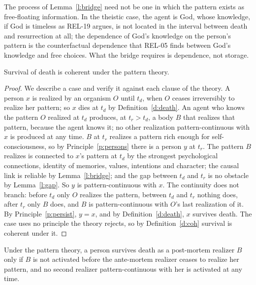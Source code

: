 \documentclass{situationist-preprint}
\begin{document}
The process of Lemma~\ref{l:bridge} need not be one in which the pattern exists as free-floating information. In the theistic case, the agent is God, whose knowledge, if God is timeless as REL-19 argues, is not located in the interval between death and resurrection at all; the dependence of God's knowledge on the person's pattern is the counterfactual dependence that REL-05 finds between God's knowledge and free choices. What the bridge requires is dependence, not storage.

\begin{theorem}[Coherence]\label{t:coh}
Survival of death is coherent under the pattern theory.
\end{theorem}

\begin{proof}
We describe a case and verify it against each clause of the theory. A person $x$ is realized by an organism $O$ until $t_d$, when $O$ ceases irreversibly to realize her pattern; so $x$ dies at $t_d$ by Definition~\ref{d:death}. An agent who knows the pattern $O$ realized at $t_d$ produces, at $t_r > t_d$, a body $B$ that realizes that pattern, because the agent knows it; no other realization pattern-continuous with $x$ is produced at any time. $B$ at $t_r$ realizes a pattern rich enough for self-consciousness, so by Principle~\ref{p:persons} there is a person $y$ at $t_r$. The pattern $B$ realizes is connected to $x$'s pattern at $t_d$ by the strongest psychological connections, identity of memories, values, intentions and character; the causal link is reliable by Lemma~\ref{l:bridge}; and the gap between $t_d$ and $t_r$ is no obstacle by Lemma~\ref{l:gap}. So $y$ is pattern-continuous with $x$. The continuity does not branch: before $t_d$ only $O$ realizes the pattern, between $t_d$ and $t_r$ nothing does, after $t_r$ only $B$ does, and $B$ is pattern-continuous with $O$'s last realization of it. By Principle~\ref{p:persist}, $y = x$, and by Definition~\ref{d:death}, $x$ survives death. The case uses no principle the theory rejects, so by Definition~\ref{d:coh} survival is coherent under it.
\end{proof}

\begin{proposition}[Timing]\label{p:timing}
Under the pattern theory, a person survives death as a post-mortem realizer $B$ only if $B$ is not activated before the ante-mortem realizer ceases to realize her pattern, and no second realizer pattern-continuous with her is activated at any time.
\end{proposition}
\end{document}
